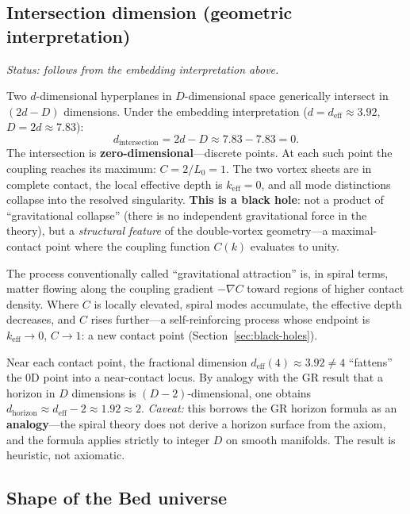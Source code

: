 \documentclass[12pt,a4paper]{article}
\newcommand{\bed}{Bed universe}
\begin{document}
\subsection{Intersection dimension (geometric interpretation)}

\noindent\textit{Status: follows from the embedding interpretation above.}

Two $d$-dimensional hyperplanes in $D$-dimensional space generically intersect in $(2d - D)$ dimensions. Under the embedding interpretation ($d = d_{\mathrm{eff}} \approx 3.92$, $D = 2d \approx 7.83$):
\begin{equation}
d_{\mathrm{intersection}} = 2d - D \approx 7.83 - 7.83 = 0.
\end{equation}
The intersection is \textbf{zero-dimensional}---discrete points.  At each such point the coupling reaches its maximum: $C = 2/L_0 = 1$.  The two vortex sheets are in complete contact, the local effective depth is $k_{\mathrm{eff}} = 0$, and all mode distinctions collapse into the resolved singularity.  \textbf{This is a black hole}: not a product of ``gravitational collapse'' (there is no independent gravitational force in the theory), but a \emph{structural feature} of the double-vortex geometry---a maximal-contact point where the coupling function $C(k)$ evaluates to unity.

The process conventionally called ``gravitational attraction'' is, in spiral terms, matter flowing along the coupling gradient $-\nabla C$ toward regions of higher contact density.  Where $C$ is locally elevated, spiral modes accumulate, the effective depth decreases, and $C$ rises further---a self-reinforcing process whose endpoint is $k_{\mathrm{eff}} \to 0$, $C \to 1$: a new contact point (Section~\ref{sec:black-holes}).

Near each contact point, the fractional dimension $d_{\mathrm{eff}}(4) \approx 3.92 \neq 4$ ``fattens'' the 0D point into a near-contact locus.  By analogy with the GR result that a horizon in $D$ dimensions is $(D{-}2)$-dimensional, one obtains $d_{\mathrm{horizon}} \approx d_{\mathrm{eff}} - 2 \approx 1.92 \approx 2$.  \emph{Caveat:} this borrows the GR horizon formula as an \textbf{analogy}---the spiral theory does not derive a horizon surface from the axiom, and the formula applies strictly to integer $D$ on smooth manifolds.  The result is heuristic, not axiomatic.

\subsection{Shape of the \bed{}}
\end{document}
